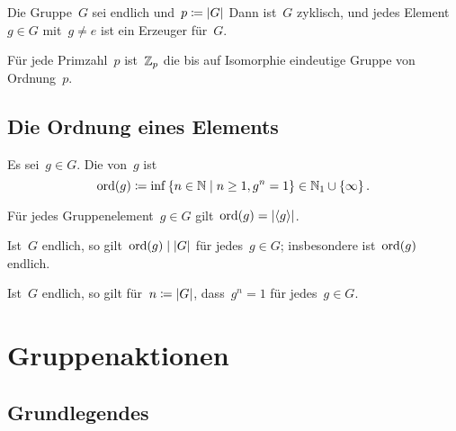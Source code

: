 \begin{proposition}
  Die Gruppe~$G$ sei endlich und~$p \coloneqq \lvert G\rvert$
  Dann ist~$G$ zyklisch, und jedes Element~$g \in G$ mit~$g \neq e$ ist ein Erzeuger für~$G$.
\end{proposition}

\begin{corollary}
  Für jede Primzahl~$p$ ist~$\mathbb{Z}_p$ die bis auf Isomorphie eindeutige Gruppe von Ordnung~$p$.
\end{corollary}



\subsection{Die Ordnung eines Elements}

\begin{definition}
  Es sei~$g \in G$.
  Die  von~$g$ ist
  \[
    \ord(g)
    \defined
    \inf
    {}
    \{
      n \in \Natural
    \suchthat
      n \geq 1,
      g^n = 1
    \}
    \in
    \Natural_1 \cup \{ \infty \} \,.
  \]
\end{definition}

\begin{proposition}
  Für jedes Gruppenelement~$g \in G$ gilt~$\operatorname{ord}(g) = \lvert\langle g\rangle\rvert$.
\end{proposition}

\begin{corollary}
  Ist~$G$ endlich, so gilt~$\operatorname{ord}(g) \mathrel{\vert} \lvert G\rvert$ für jedes~$g \in G$;
  insbesondere ist~$\operatorname{ord}(g)$ endlich.
\end{corollary}

\begin{corollary}
  Ist~$G$ endlich, so gilt für~$n \coloneqq \lvert G\rvert$, dass~$g^n = 1$ für jedes~$g \in G$.
\end{corollary}





\section{Gruppenaktionen}



\subsection{Grundlegendes}

